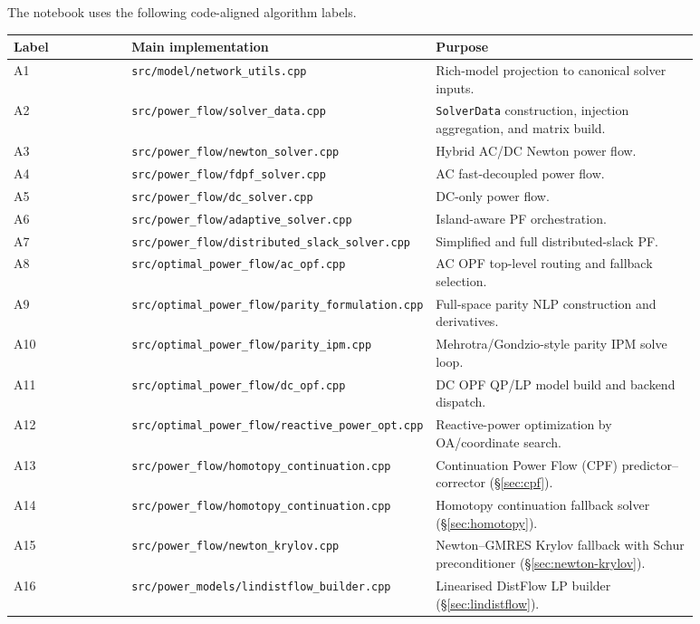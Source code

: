 The notebook uses the following code-aligned algorithm labels.
\begin{longtable}{L{0.18\linewidth}L{0.30\linewidth}L{0.40\linewidth}}
\toprule
Label & Main implementation & Purpose \\
\midrule
\endhead
A1 & \texttt{src/model/network\_utils.cpp} & Rich-model projection to canonical solver inputs. \\
A2 & \texttt{src/power\_flow/solver\_data.cpp} & \texttt{SolverData} construction, injection aggregation, and matrix build. \\
A3 & \texttt{src/power\_flow/newton\_solver.cpp} & Hybrid AC/DC Newton power flow. \\
A4 & \texttt{src/power\_flow/fdpf\_solver.cpp} & AC fast-decoupled power flow. \\
A5 & \texttt{src/power\_flow/dc\_solver.cpp} & DC-only power flow. \\
A6 & \texttt{src/power\_flow/adaptive\_solver.cpp} & Island-aware PF orchestration. \\
A7 & \texttt{src/power\_flow/distributed\_slack\_solver.cpp} & Simplified and full distributed-slack PF. \\
A8 & \texttt{src/optimal\_power\_flow/ac\_opf.cpp} & AC OPF top-level routing and fallback selection. \\
A9 & \texttt{src/optimal\_power\_flow/parity\_formulation.cpp} & Full-space parity NLP construction and derivatives. \\
A10 & \texttt{src/optimal\_power\_flow/parity\_ipm.cpp} & Mehrotra/Gondzio-style parity IPM solve loop. \\
A11 & \texttt{src/optimal\_power\_flow/dc\_opf.cpp} & DC OPF QP/LP model build and backend dispatch. \\
A12 & \texttt{src/optimal\_power\_flow/reactive\_power\_opt.cpp} & Reactive-power optimization by OA/coordinate search. \\
A13 & \texttt{src/power\_flow/homotopy\_continuation.cpp} & Continuation Power Flow (CPF) predictor--corrector (§\ref{sec:cpf}). \\
A14 & \texttt{src/power\_flow/homotopy\_continuation.cpp} & Homotopy continuation fallback solver (§\ref{sec:homotopy}). \\
A15 & \texttt{src/power\_flow/newton\_krylov.cpp} & Newton--GMRES Krylov fallback with Schur preconditioner (§\ref{sec:newton-krylov}). \\
A16 & \texttt{src/power\_models/lindistflow\_builder.cpp} & Linearised DistFlow LP builder (§\ref{sec:lindistflow}). \\

\end{longtable}
